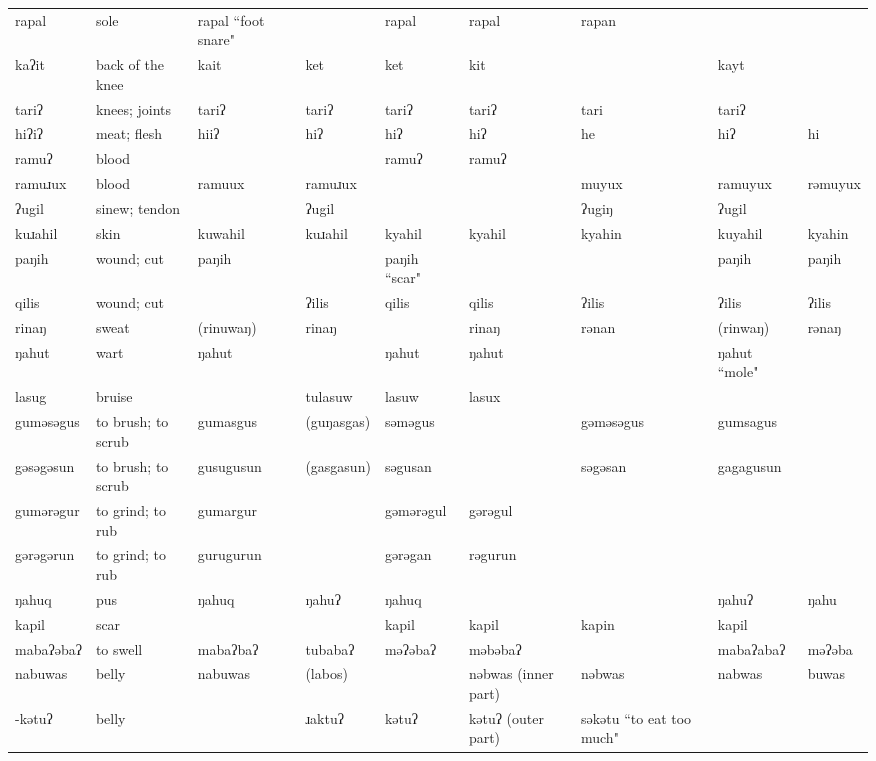 \begin{landscape}
\begin{longtable}{*{9}{p{}}}
\text{*}rapal & sole & rapal ``foot snare" &  & rapal & rapal & rapan &  & \\
\text{*}kaʔit & back of the knee & kait & ket & ket & kit &  & kayt & \\
\text{*}tariʔ & knees; joints & tariʔ & tariʔ & tariʔ & tariʔ & tari & tariʔ & \\
\text{*}hiʔiʔ & meat; flesh & hiiʔ & hiʔ & hiʔ & hiʔ & he & hiʔ & hi\\
\text{*}ramuʔ & blood &  &  & ramuʔ & ramuʔ &  &  & \\
\text{*}ramuɹux & blood & ramuux & ramuɹux &  &  & muyux & ramuyux & rəmuyux\\
\text{*}ʔugil & sinew; tendon &  & ʔugil &  &  & ʔugiŋ & ʔugil & \\
\text{*}kuɹahil & skin & kuwahil & kuɹahil & kyahil & kyahil & kyahin & kuyahil & kyahin\\
\text{*}paŋih & wound; cut & paŋih &  & paŋih ``scar" &  &  & paŋih & paŋih\\
\text{*}qilis & wound; cut &  & ʔilis & qilis & qilis & ʔilis & ʔilis & ʔilis\\
\text{*}rinaŋ & sweat & (rinuwaŋ) & rinaŋ &  & rinaŋ & rənan & (rinwaŋ) & rənaŋ\\
\text{*}ŋahut & wart & ŋahut &  & ŋahut & ŋahut &  & ŋahut ``mole" & \\
\text{*}lasug & bruise &  & tulasuw & lasuw & lasux &  &  & \\
\text{*}guməsəgus & to brush; to scrub & gumasgus & (guŋasgas) & səməgus &  & gəməsəgus & gumsagus & \\
\text{*}gəsəgəsun & to brush; to scrub & gusugusun & (gasgasun) & səgusan &  & səgəsan & gagagusun & \\
\text{*}gumərəgur & to grind; to rub & gumargur &  & gəmərəgul & gərəgul &  &  & \\
\text{*}gərəgərun & to grind; to rub & gurugurun &  & gərəgan & rəgurun &  &  & \\
\text{*}ŋahuq & pus & ŋahuq & ŋahuʔ & ŋahuq &  &  & ŋahuʔ & ŋahu\\
\text{*}kapil & scar &  &  & kapil & kapil & kapin & kapil & \\
\text{*}mabaʔəbaʔ & to swell & mabaʔbaʔ & tubabaʔ & məʔəbaʔ & məbəbaʔ &  & mabaʔabaʔ & məʔəba\\
\text{*}nabuwas & belly & nabuwas & (labos) &  & nəbwas (inner part) & nəbwas & nabwas & buwas\\
\text{*}-kətuʔ & belly &  & ɹaktuʔ & kətuʔ & kətuʔ (outer part) & səkətu ``to eat too much" &  & \\

\end{longtable}
\end{landscape}
